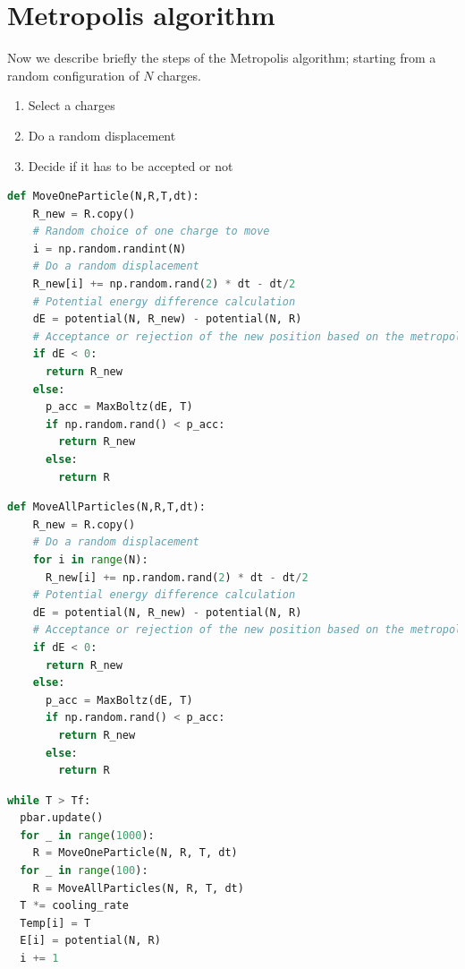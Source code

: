 \documentclass{article}
\begin{document}
\section{Metropolis algorithm}
Now we describe briefly the steps of the Metropolis algorithm; starting from a random configuration of $N$ charges.
\begin{enumerate}
    \item Select a charges
    \item Do a random displacement
    \item Decide if it has to be accepted or not
\end{enumerate}

\begin{lstlisting}[language=Python]
def MoveOneParticle(N,R,T,dt):
    R_new = R.copy()
    # Random choice of one charge to move
    i = np.random.randint(N)
    # Do a random displacement
    R_new[i] += np.random.rand(2) * dt - dt/2
    # Potential energy difference calculation
    dE = potential(N, R_new) - potential(N, R)
    # Acceptance or rejection of the new position based on the metropolis algorithm
    if dE < 0:
      return R_new
    else:
      p_acc = MaxBoltz(dE, T)
      if np.random.rand() < p_acc:
        return R_new
      else:
        return R
\end{lstlisting}
\begin{lstlisting}[language=Python]
def MoveAllParticles(N,R,T,dt):
    R_new = R.copy()
    # Do a random displacement
    for i in range(N):
      R_new[i] += np.random.rand(2) * dt - dt/2
    # Potential energy difference calculation
    dE = potential(N, R_new) - potential(N, R)
    # Acceptance or rejection of the new position based on the metropolis algorithm
    if dE < 0:
      return R_new
    else:
      p_acc = MaxBoltz(dE, T)
      if np.random.rand() < p_acc:
        return R_new
      else:
        return R
\end{lstlisting}
\begin{lstlisting}[language=Python]
while T > Tf:
  pbar.update()
  for _ in range(1000):
    R = MoveOneParticle(N, R, T, dt)
  for _ in range(100):
    R = MoveAllParticles(N, R, T, dt)
  T *= cooling_rate
  Temp[i] = T
  E[i] = potential(N, R)
  i += 1
\end{lstlisting}
\clearpage
\end{document}
